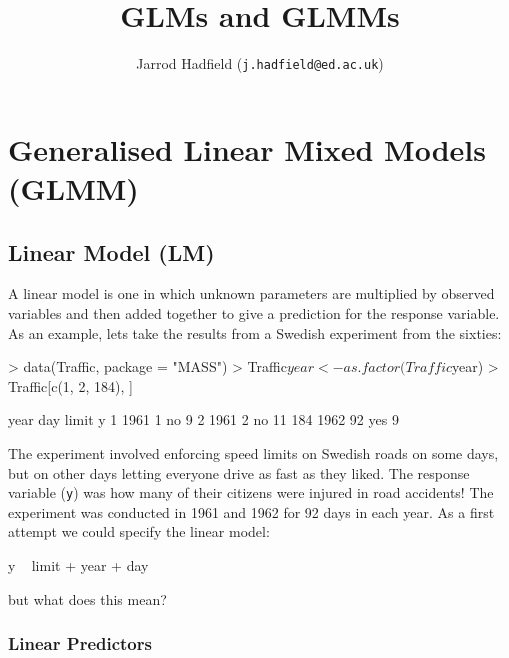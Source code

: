 \documentclass{article}
\title{GLMs and GLMMs}
\author{Jarrod Hadfield (\texttt{j.hadfield@ed.ac.uk})}
\begin{document}
\maketitle
\else
\chapter[GLMM]{Generalised Linear Mixed Models (GLMM)}
\label{chap2}
\fi



\section{Linear Model (LM)}

A linear model is one in which unknown parameters are multiplied by observed variables and then added together to give a prediction for the response variable. As an example, lets take the results from a Swedish experiment from the sixties:

\begin{Schunk}
\begin{Sinput}
> data(Traffic, package = "MASS")
> Traffic$year <- as.factor(Traffic$year)
> Traffic[c(1, 2, 184), ]
\end{Sinput}
\begin{Soutput}
    year day limit  y
1   1961   1    no  9
2   1961   2    no 11
184 1962  92   yes  9
\end{Soutput}
\end{Schunk}

The experiment involved enforcing speed limits on Swedish roads on some days, but on other days letting everyone drive as fast as they liked.  The response variable (\texttt{y}) was how many of their citizens were injured in road accidents! The experiment was conducted in 1961 and 1962 for 92 days in each year. As a first attempt we could specify the linear model:

\begin{Schunk}
\begin{Soutput}
y ~ limit + year + day
\end{Soutput}
\end{Schunk}

but what does this mean?\\

\subsection{Linear Predictors}
\label{lm-sec}
\end{document}
